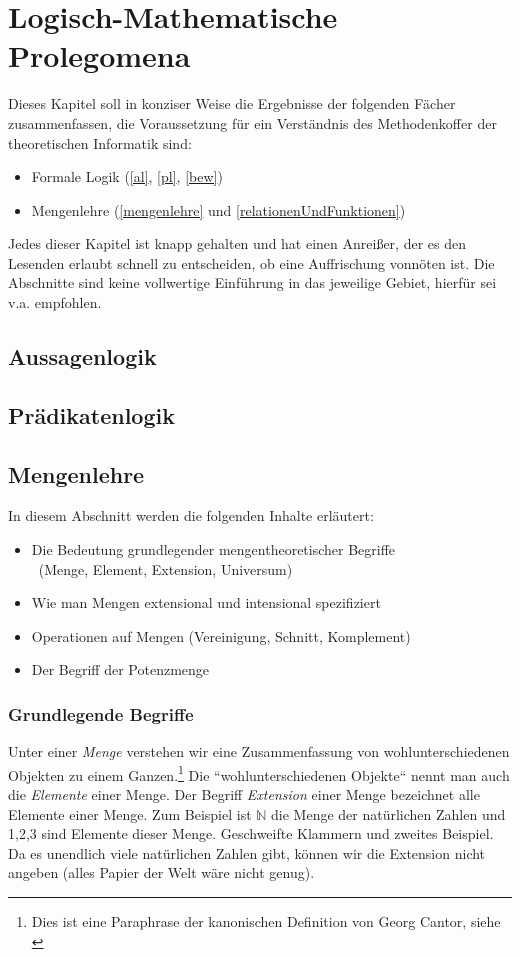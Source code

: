 \chapter{Logisch-Mathematische Prolegomena}
Dieses Kapitel soll in konziser Weise die Ergebnisse der folgenden Fächer zusammenfassen,
die Voraussetzung für ein Verständnis des Methodenkoffer der theoretischen Informatik sind:
\begin{itemize}
    \item Formale Logik (\autoref{al}, \autoref{pl}, \autoref{bew})
    \item Mengenlehre (\autoref{mengenlehre} und \autoref{relationenUndFunktionen})
\end{itemize}
Jedes dieser Kapitel ist knapp gehalten und hat einen Anreißer,
der es den Lesenden erlaubt schnell zu entscheiden,
ob eine Auffrischung vonnöten ist.
Die Abschnitte sind keine vollwertige Einführung in das jeweilige Gebiet,
hierfür sei v.a. \cite{link} empfohlen.

\section{Aussagenlogik}\label{al}
\section{Prädikatenlogik}\label{pl}
\section{Mengenlehre}\label{mengenlehre}
In diesem Abschnitt werden die folgenden Inhalte erläutert:
\begin{itemize}
    \item Die Bedeutung grundlegender mengentheoretischer Begriffe\\\
        (Menge, Element, Extension, Universum)
    \item Wie man Mengen extensional und intensional spezifiziert
    \item Operationen auf Mengen (Vereinigung, Schnitt, Komplement)
    \item Der Begriff der Potenzmenge
\end{itemize}
\subsection{Grundlegende Begriffe}\label{grundmenge}
Unter einer \emph{Menge} verstehen wir eine Zusammenfassung von wohlunterschiedenen Objekten
zu einem Ganzen.\footnote{
    Dies ist eine Paraphrase der kanonischen Definition von Georg Cantor, siehe \cite{cantor}
}
Die ``wohlunterschiedenen Objekte`` nennt man auch die \emph{Elemente} einer Menge.
Der Begriff \emph{Extension} einer Menge bezeichnet alle Elemente einer Menge.
Zum Beispiel ist $\mathbb{N}$ die Menge der natürlichen Zahlen
und 1,2,3 sind Elemente dieser Menge.
Geschweifte Klammern und zweites Beispiel.
Da es unendlich viele natürlichen Zahlen gibt,
können wir die Extension nicht angeben (alles Papier der Welt wäre nicht genug).

